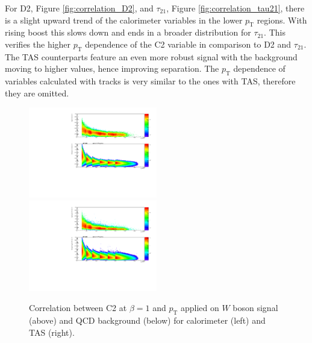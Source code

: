 For D2, Figure \ref{fig:correlation_D2}, and $\tau_{21}$, Figure \ref{fig:correlation_tau21}, there is a slight upward trend of the calorimeter variables in the lower $p_{\mathrm{T}}$ regions. With rising boost this slows down and ends in a broader distribution for $\tau_{21}$. This verifies the higher $p_{\mathrm{T}}$ dependence of the C2 variable in comparison to D2 and $\tau_{21}$. The TAS counterparts feature an even more robust signal with the background moving to higher values, hence improving separation. The $p_{\mathrm{T}}$ dependence of variables calculated with tracks is very similar to the ones with TAS, therefore they are omitted.
\begin{figure}[htp]
\includegraphics[width=0.5\textwidth]{sascha_input/plots/W/beta1/scatter_plots/scatter_h_scatter_reco_C2.pdf}
\bigskip
\includegraphics[width=0.5\textwidth]{sascha_input/plots/W/beta1/scatter_plots/scatter_h_scatter_assisted_tj_C2.pdf} 
\caption{\footnotesize{Correlation between C2 at $\beta=1$ and $p_{\mathrm{T}}$ applied on $W$ boson signal (above) and QCD background (below) for calorimeter (left) and TAS (right).}}\label{fig:correlation_C2}
\end{figure}
